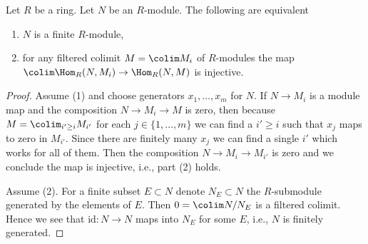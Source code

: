\begin{lemma}
\label{lemma-characterize-finite-module-hom}
Let $R$ be a ring. Let $N$ be an $R$-module. The following are equivalent
\begin{enumerate}
\item $N$ is a finite $R$-module,
\item for any filtered colimit $M = \colim M_i$ of $R$-modules the map
$\colim \Hom_R(N, M_i) \to \Hom_R(N, M)$ is injective.
\end{enumerate}
\end{lemma}

\begin{proof}
Assume (1) and choose generators $x_1, \ldots, x_m$ for $N$.
If $N \to M_i$ is a module map and the composition
$N \to M_i \to M$ is zero, then because $M = \colim_{i' \geq i} M_{i'}$
for each $j \in \{1, \ldots, m\}$ we can find a $i' \geq i$ such that
$x_j$ maps to zero in $M_{i'}$. Since there are finitely many
$x_j$ we can find a single $i'$ which works for all of them.
Then the composition $N \to M_i \to M_{i'}$ is zero and we conclude
the map is injective, i.e., part (2) holds.

\medskip\noindent
Assume (2). For a finite subset $E \subset N$ denote $N_E \subset N$
the $R$-submodule generated by the elements of $E$. Then
$0 = \colim N/N_E$ is a filtered colimit. Hence we see that
$\text{id} : N \to N$ maps into $N_E$ for some $E$, i.e., $N$
is finitely generated.
\end{proof}